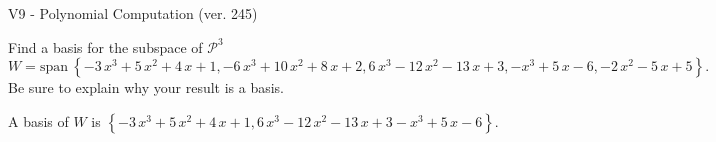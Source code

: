 \begin{exercise}
  \begin{exerciseTitle}V9 - Polynomial Computation (ver. 245)\end{exerciseTitle}
  \begin{exerciseStatement}
    Find a basis for the subspace of \(\mathcal{P}^3\) 
\[W=\mathrm{span}\ \left\{-3 \, x^{3} + 5 \, x^{2} + 4 \, x + 1 , -6 \, x^{3} + 10 \, x^{2} + 8 \, x + 2 , 6 \, x^{3} - 12 \, x^{2} - 13 \, x + 3 , -x^{3} + 5 \, x - 6 , -2 \, x^{2} - 5 \, x + 5\right\}.\]
 Be sure to explain why your result is a basis.


  \end{exerciseStatement}
  \begin{exerciseAnswer}
   A basis of \(W\) is  \(\left\{-3 \, x^{3} + 5 \, x^{2} + 4 \, x + 1 , 6 \, x^{3} - 12 \, x^{2} - 13 \, x + 3 -x^{3} + 5 \, x - 6\right\}\).
  


  \end{exerciseAnswer}
\end{exercise}